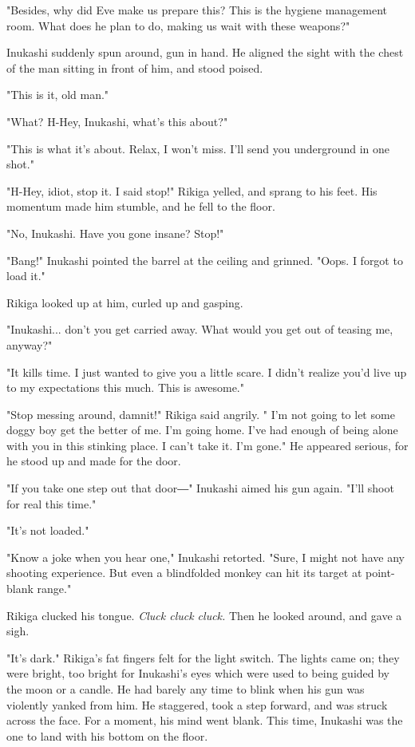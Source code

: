 "Besides, why did Eve make us prepare this? This is the hygiene
management room. What does he plan to do, making us wait with these
weapons?"

Inukashi suddenly spun around, gun in hand. He aligned the sight with
the chest of the man sitting in front of him, and stood poised.

"This is it, old man."

"What? H-Hey, Inukashi, what's this about?"

"This is what it's about. Relax, I won't miss. I'll send you underground
in one shot."

"H-Hey, idiot, stop it. I said stop!" Rikiga yelled, and sprang to his
feet. His momentum made him stumble, and he fell to the floor.

"No, Inukashi. Have you gone insane? Stop!"

"Bang!" Inukashi pointed the barrel at the ceiling and grinned. "Oops. I
forgot to load it."

Rikiga looked up at him, curled up and gasping.

"Inukashi... don't you get carried away. What would you get out of
teasing me, anyway?"

"It kills time. I just wanted to give you a little scare. I didn't
realize you'd live up to my expectations this much. This is awesome."

"Stop messing around, damnit!" Rikiga said angrily. " I'm not going to
let some doggy boy get the better of me. I'm going home. I've had enough
of being alone with you in this stinking place. I can't take it. I'm
gone." He appeared serious, for he stood up and made for the door.

"If you take one step out that door―" Inukashi aimed his gun again.
"I'll shoot for real this time."

"It's not loaded."

"Know a joke when you hear one," Inukashi retorted. "Sure, I might not
have any shooting experience. But even a blindfolded monkey can hit its
target at point-blank range."

Rikiga clucked his tongue. \emph{Cluck cluck cluck.} Then he looked around, and
gave a sigh.

"It's dark." Rikiga's fat fingers felt for the light switch. The lights
came on; they were bright, too bright for Inukashi's eyes which were
used to being guided by the moon or a candle. He had barely any time to
blink when his gun was violently yanked from him. He staggered, took a
step forward, and was struck across the face. For a moment, his mind
went blank. This time, Inukashi was the one to land with his bottom on
the floor.

